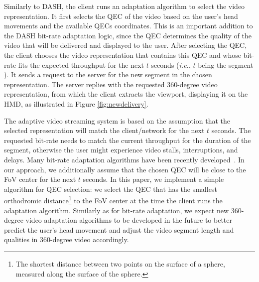  Similarly to \ac{DASH}, the client runs an
adaptation algorithm to select the video representation. It first
selects the \ac{QEC} of the video based on the user's head movements and
the available \acp{QEC} coordinates. This is an important addition to the
DASH bit-rate adaptation logic, since the \ac{QEC} determines the quality of
the video that will be delivered and displayed to the user. After
selecting the \ac{QEC}, the client chooses the video representation that
contains this \ac{QEC} and whose bit-rate fits the expected throughput for
the next $t$ seconds (\textit{i.e.}, $t$ being the segment ). It
sends a request to the server for the new segment in the chosen
representation. The server replies with the requested 360-degree video
representation, from which the client extracts the viewport,
displaying it on the HMD, as illustrated in Figure
\ref{fig:newdelivery}.

The adaptive video streaming system is based on the assumption that
the selected representation will match the client/network
 for the next $t$ seconds. The requested bit-rate
needs to match the current throughput for the duration of the segment,
otherwise the user might experience video stalls, interruptions, and
delays. Many bit-rate adaptation algorithms have been recently
developed~\cite{tian,probe_li_2014,miller,zou,liu}. In our approach,
we additionally assume that the chosen \ac{QEC} will be close to the
\ac{FoV} center for the next $t$ seconds. In this paper, we implement
a simple algorithm for \ac{QEC} selection: we select the \ac{QEC} that
has the smallest orthodromic distance\footnote{The shortest distance
between two points on the surface of a sphere, measured along the
surface of the sphere. } to the \ac{FoV} center at the time the client
runs the adaptation algorithm.
Similarly as for bit-rate adaptation, we expect new 360-degree video
adaptation algorithms to be developed in the future to better predict
the user's head movement and adjust the video segment length and
qualities in 360-degree video accordingly.



